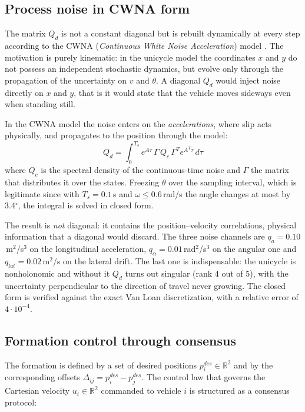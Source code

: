 \documentclass[conference,9pt]{IEEEtran}
\begin{document}
\subsection{Process noise in CWNA form}
\label{sub:cwna}

The matrix $Q_d$ is not a constant diagonal but is rebuilt dynamically at every
step according to the CWNA (\emph{Continuous White Noise Acceleration}) model
\cite{barshalom2001}. The motivation is purely kinematic: in the unicycle model
the coordinates $x$ and $y$ do not possess an independent stochastic dynamics,
but evolve only through the propagation of the uncertainty on $v$ and $\theta$.
A diagonal $Q_d$ would inject noise directly on $x$ and $y$, that is it would
state that the vehicle moves sideways even when standing still.

In the CWNA model the noise enters on the \emph{accelerations}, where slip acts
physically, and propagates to the position through the model:
\begin{equation}
Q_d = \int_0^{T_s} e^{A\tau}\,\Gamma\,Q_c\,\Gamma^T e^{A^T\tau}\,d\tau
\label{eq:cwna}
\end{equation}
where $Q_c$ is the spectral density of the continuous-time noise and $\Gamma$
the matrix that distributes it over the states. Freezing $\theta$ over the
sampling interval, which is legitimate since with $T_s = 0.1$\,s and
$\omega \leq 0.6$\,rad/s the angle changes at most by 3.4$^\circ$, the integral
is solved in closed form.

The result is \emph{not} diagonal: it contains the position--velocity
correlations, physical information that a diagonal would discard. The three
noise channels are $q_a = 0.10$\,m$^2$/s$^3$ on the longitudinal acceleration,
$q_\alpha = 0.01$\,rad$^2$/s$^3$ on the angular one and
$q_{lat} = 0.02$\,m$^2$/s on the lateral drift. The last one is
indispensable: the unicycle is nonholonomic and without it $Q_d$ turns out
singular (rank 4 out of 5), with the uncertainty perpendicular to the direction
of travel never growing. The closed form is verified against the exact Van Loan
discretization, with a relative error of $4\cdot10^{-4}$.

\subsection{Formation control through consensus}
\label{sub:consenso}

The formation is defined by a set of desired positions
$p_i^{des} \in \mathbb{R}^2$ and by the corresponding offsets
$\Delta_{ij} = p_i^{des} - p_j^{des}$. The control law that governs the
Cartesian velocity $u_i \in \mathbb{R}^2$ commanded to vehicle $i$ is
structured as a consensus protocol:
\end{document}
